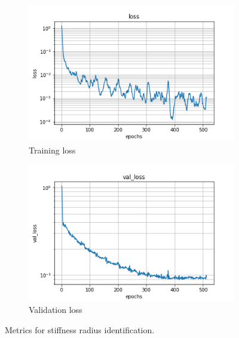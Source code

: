 \documentclass{article}
\begin{document}
\begin{figure}
\centering
\begin{subfigure}[b]{0.45\textwidth}
    \centering
    \includegraphics[totalheight=4cm]{circle_id/stiffrad/plotloss.png}
    \caption{Training loss}
  \end{subfigure}
%
\begin{subfigure}[b]{0.45\textwidth}
    \centering
    \includegraphics[totalheight=4cm]{circle_id/stiffrad/plotval_loss.png}
    \caption{Validation loss}
  \end{subfigure}
%
\caption{\label{fig:stiffradmetrics} Metrics for stiffness radius identification.}
\end{figure}
%
%
\end{document}
